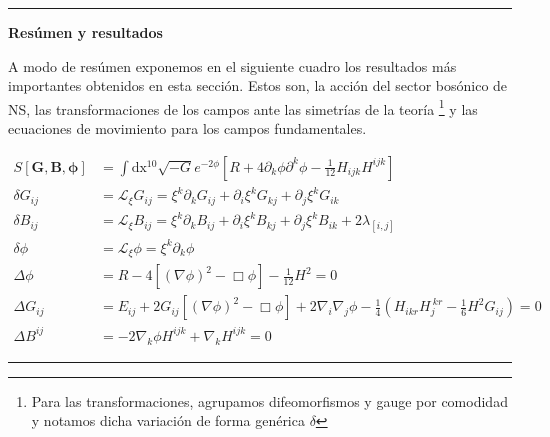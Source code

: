 \documentclass{article}
\numberwithin{equation}{section}
\begin{document}
\begin{center}
\rule{.6\textwidth}{1pt}
\end{center}

\begin{large}
\textbf{Resúmen y resultados}\\
\end{large}

A modo de resúmen exponemos en el siguiente cuadro los resultados más importantes obtenidos en esta sección. Estos son, la acción del sector bosónico de NS, las transformaciones de los campos ante las simetrías de la teoría \footnote{Para las transformaciones, agrupamos difeomorfismos y gauge por comodidad y notamos dicha variación de forma genérica $ \delta $} y las ecuaciones de movimiento para los campos fundamentales.\\

\begin{boxumen}

\begin{equation*}
\begin{aligned}
S[\textbf{G},\textbf{B},\pmb{\phi}]&=\int\mathrm{dx^{10}} \sqrt{-G}e^{-2\phi}\left[R + 4 \partial_k\phi\partial^k \phi - \frac{1}{12} H_{i j k}H^{i j k}\right]\\
\delta G_{i j} &= \mathcal{L}_{\xi}G_{i j} = \xi^k \partial_k G_{i j} + \partial_i \xi^k G_{k j} + \partial_j \xi^k G_{i k}\\ 
\delta B_{i j} &= \mathcal{L}_{\xi}B_{i j} = \xi^k \partial_k B_{i j} + \partial_i \xi^k B_{k j} + \partial_j \xi^k B_{i k} + 2 \lambda_{\left[i , j\right]} \\
\delta \phi &= \mathcal{L}_{\xi} \phi = \xi^k \partial_k \phi\\
\Delta \phi &= R - 4 \left[ \left(\nabla \phi\right)^2 - \Box \phi \right] - \frac{1}{12} H^2 = 0\\
\Delta G_{ij} &= E_{ij} + 2 G_{ij} \left[ \left(\nabla \phi\right)^2 - \Box \phi \right] + 2 \nabla_{i}\nabla_{j} \phi - \frac{1}{4} \left( H_{i k r} H_{j}^{ \ k r} - \frac{1}{6} H^2 G_{ij} \right) = 0\\
\Delta B^{ij} &= -2 \nabla_k \phi  H^{ij k} +  \nabla_k H^{i j k}=0
\end{aligned}
\end{equation*}

\end{boxumen}
 
\begin{center}
	\rule{.6\textwidth}{1pt}
\end{center}
\end{document}
